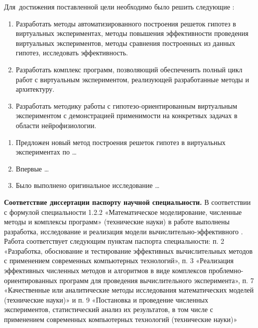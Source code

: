 Для~достижения поставленной цели необходимо было решить следующие {\tasks}:
\begin{enumerate}[beginpenalty=10000] %
    \item Разработать методы автоматизированного построения решеток гипотез в виртуальных экспериментах, 
            методы повышения эффективности проведения виртуальных экспериментов, методы сравнения построенных 
            из данных гипотез, исследовать эффективность.
    \item Разработать комплекс программ, позволяющий обеспеченить полный цикл работ с виртуальным экспериментом, 
            реализующей разработанные методы и архитектуру.
    \item Разработать методику работы с гипотезо-ориентированным виртуальным экспериментом с демонстрацией 
            применимости на конкретных задачах в области нейрофизиологии.
\end{enumerate}


{\novelty}
\begin{enumerate}[beginpenalty=10000] %
  \item Предложен новый метод построения решеток гипотез в виртуальных экспериментах по  \ldots
  \item Впервые \ldots
  \item Было выполнено оригинальное исследование \ldots
\end{enumerate}

\textbf{Соответствие диссертации паспорту научной специальности.}
В соответствии с формулой специальности 1.2.2 «Математическое моделирование, численные методы и комплексы программ» (технические науки)
в работе выполнены разработка, исследование и реализация модели вычислительно-эффективного . Работа соответствует следующим пунктам паспорта специальности: п. 2 «Разработка,
обоснование и тестирование эффективных вычислительных методов с
применением современных компьютерных технологий», п. 3 «Реализация эффективных численных методов и алгоритмов в виде комплексов
проблемно-ориентированных программ для проведения вычислительного
эксперимента», п. 7 «Качественные или аналитические методы исследования математических моделей (технические науки)» и п. 9 «Постановка и
проведение численных экспериментов, статистический анализ их результатов, в том числе с применением современных компьютерных технологий
(технические науки)»

